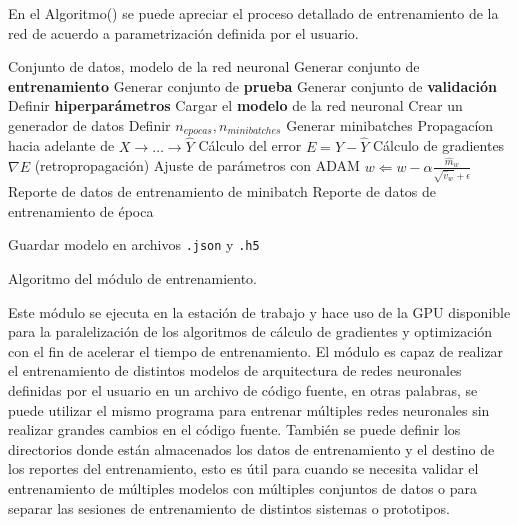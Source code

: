     En el Algoritmo() se puede apreciar el proceso detallado de entrenamiento de la red de acuerdo a parametrización definida 
    por el usuario. 
    
    \begin{algorithm}
        \begin{algorithmic}[1]
        \REQUIRE Conjunto de datos, modelo de la red neuronal
        \STATE Generar conjunto de \textbf{entrenamiento}
        \STATE Generar conjunto de \textbf{prueba}
        \STATE Generar conjunto de \textbf{validación}
        \STATE Definir \textbf{hiperparámetros}
        \STATE Cargar el \textbf{modelo} de la red neuronal
        \STATE Crear un generador de datos
        \STATE Definir $n_{epocas}, n_{minibatches}$
            \STATE Generar minibatches
                \STATE Propagacíon hacia adelante de $X\rightarrow\dots \rightarrow\hat{Y}$ 
                \STATE Cálculo del error $E = Y - \hat{Y}$
                \STATE Cálculo de gradientes $\nabla E$ (retropropagación)
                \STATE Ajuste de parámetros con ADAM $w \Leftarrow w - \alpha \frac{\hat{m}_w}{\sqrt{\hat{v}_w} + \epsilon}$
                \STATE Reporte de datos de entrenamiento de minibatch
            \ENDFOR
            \STATE Reporte de datos de entrenamiento de época
        \ENDFOR

        \STATE Guardar modelo en archivos \lstinline{.json} y \lstinline{.h5}
        
        \end{algorithmic}
        \caption{Algoritmo del módulo de entrenamiento.}\label{alg:training}
    \end{algorithm}

    Este módulo se ejecuta en la estación de trabajo y hace uso de la GPU disponible para la paralelización de los algoritmos de 
    cálculo de gradientes y optimización con el fin de acelerar el tiempo de entrenamiento. El módulo es capaz de realizar 
    el entrenamiento de distintos modelos de arquitectura de redes neuronales definidas por el usuario en un archivo de código 
    fuente, en otras palabras, se puede utilizar el mismo programa para entrenar múltiples redes neuronales sin realizar grandes 
    cambios en el código fuente. También se puede definir los directorios donde están almacenados los datos de entrenamiento y 
    el destino de los reportes del entrenamiento, esto es útil para cuando se necesita validar el entrenamiento de múltiples 
    modelos con múltiples conjuntos de datos o para separar las sesiones de entrenamiento de distintos sistemas o prototipos.

